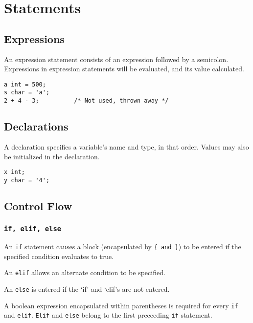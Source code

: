 \section{Statements}

    \subsection{Expressions}
        An expression statement consists of an expression followed by a semicolon. Expressions in expression statements will be evaluated, and its value calculated.

        \begin{lstlisting}
a int = 500;
s char = 'a';
2 + 4 - 3;          /* Not used, thrown away */
        \end{lstlisting}


    \subsection{Declarations}
        A declaration specifies a variable's name and type, in that order. Values may also be initialized in the declaration.

        \begin{lstlisting}
x int;
y char = '4';
        \end{lstlisting}

    \subsection{Control Flow}

        \subsubsection{\texttt{if, elif, else}}
            An \texttt{if} statement causes a block (encapsulated by \verb|{ and }|) to be entered if the specified condition evaluates to true.

            \vspace{5mm}
            \noindent An \texttt{elif} allows an alternate condition to be specified.
            
            \vspace{5mm}
            \noindent An \texttt{else} is entered if the `if' and `elif's are not entered. 
           
           \vspace{5mm}
            \noindent A boolean expression encapsulated within parentheses is required for every \texttt{if} and \texttt{elif}. \texttt{Elif} and \texttt{else} belong to the first preceeding \texttt{if} statement. 


